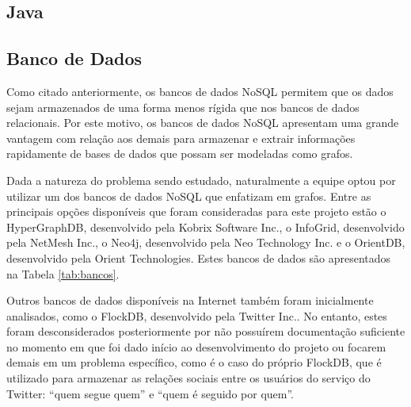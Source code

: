 \subsection{Java}

\subsection{Banco de Dados}

Como citado anteriormente, os bancos de dados NoSQL permitem que os dados sejam armazenados de uma forma menos rígida que nos bancos de dados relacionais.
Por este motivo, os bancos de dados NoSQL apresentam uma grande vantagem com relação aos demais para armazenar e extrair informações rapidamente de bases de dados que possam ser modeladas como grafos. %

Dada a natureza do problema sendo estudado, naturalmente a equipe optou por utilizar um dos bancos de dados NoSQL que enfatizam em grafos.
Entre as principais opções disponíveis que foram consideradas para este projeto estão o HyperGraphDB, desenvolvido pela Kobrix Software Inc., o InfoGrid, desenvolvido pela NetMesh Inc., o Neo4j, desenvolvido pela Neo Technology Inc. e o OrientDB, desenvolvido pela Orient Technologies.
Estes bancos de dados são apresentados na Tabela \ref{tab:bancos}.

Outros bancos de dados disponíveis na Internet também foram inicialmente analisados, como o FlockDB, desenvolvido pela Twitter Inc..
No entanto, estes foram desconsiderados posteriormente por não possuírem documentação suficiente no momento em que foi dado início ao desenvolvimento do projeto ou focarem demais em um problema específico, como é o caso do próprio FlockDB, que é utilizado para armazenar as relações sociais entre os usuários do serviço do Twitter: ``quem segue quem'' e ``quem é seguido por quem''.

